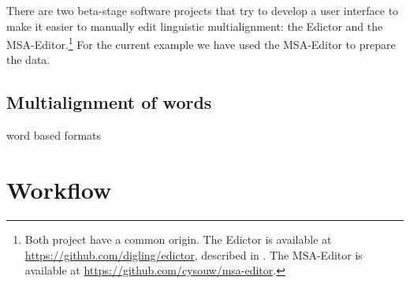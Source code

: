 \documentclass[11pt]{article}
\begin{document}
There are two beta-stage software projects that try to develop a user interface to make it easier to manually edit linguistic multialignment: the Edictor and the MSA-Editor.\footnote{Both project have a common origin. The Edictor is available at \url{https://github.com/digling/edictor}, described in \textcite{list2017}. The MSA-Editor is available at \url{https://github.com/cysouw/msa-editor}.} For the current example we have used the MSA-Editor to prepare the data.

\subsection{Multialignment of words}

word based formats

\section{Workflow}

\printbibliography
\end{document}
